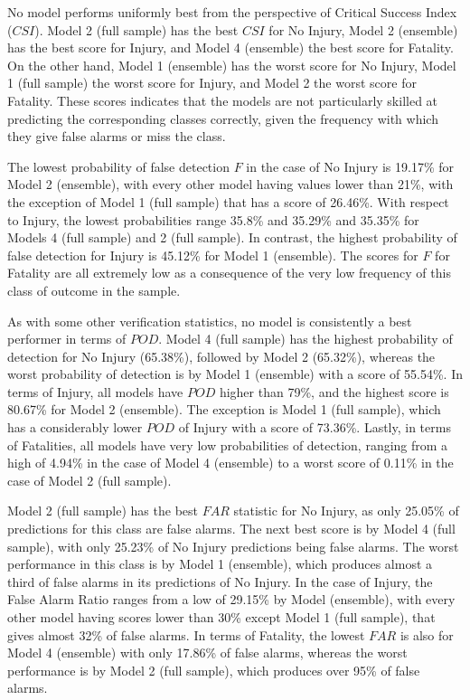 \documentclass[]{elsarticle} %
\begin{document}
No model performs uniformly best from the perspective of Critical
Success Index (\(CSI\)). Model 2 (full sample) has the best \(CSI\) for
No Injury, Model 2 (ensemble) has the best score for Injury, and Model 4
(ensemble) the best score for Fatality. On the other hand, Model 1
(ensemble) has the worst score for No Injury, Model 1 (full sample) the
worst score for Injury, and Model 2 the worst score for Fatality. These
scores indicates that the models are not particularly skilled at
predicting the corresponding classes correctly, given the frequency with
which they give false alarms or miss the class.

The lowest probability of false detection \(F\) in the case of No Injury
is 19.17\% for Model 2 (ensemble), with every other model having values
lower than 21\%, with the exception of Model 1 (full sample) that has a
score of 26.46\%. With respect to Injury, the lowest probabilities range
35.8\% and 35.29\% and 35.35\% for Models 4 (full sample) and 2 (full
sample). In contrast, the highest probability of false detection for
Injury is 45.12\% for Model 1 (ensemble). The scores for \(F\) for
Fatality are all extremely low as a consequence of the very low
frequency of this class of outcome in the sample.

As with some other verification statistics, no model is consistently a
best performer in terms of \(POD\). Model 4 (full sample) has the
highest probability of detection for No Injury (65.38\%), followed by
Model 2 (65.32\%), whereas the worst probability of detection is by
Model 1 (ensemble) with a score of 55.54\%. In terms of Injury, all
models have \(POD\) higher than 79\%, and the highest score is 80.67\%
for Model 2 (ensemble). The exception is Model 1 (full sample), which
has a considerably lower \(POD\) of Injury with a score of 73.36\%.
Lastly, in terms of Fatalities, all models have very low probabilities
of detection, ranging from a high of 4.94\% in the case of Model 4
(ensemble) to a worst score of 0.11\% in the case of Model 2 (full
sample).

Model 2 (full sample) has the best \(FAR\) statistic for No Injury, as
only 25.05\% of predictions for this class are false alarms. The next
best score is by Model 4 (full sample), with only 25.23\% of No Injury
predictions being false alarms. The worst performance in this class is
by Model 1 (ensemble), which produces almost a third of false alarms in
its predictions of No Injury. In the case of Injury, the False Alarm
Ratio ranges from a low of 29.15\% by Model (ensemble), with every other
model having scores lower than 30\% except Model 1 (full sample), that
gives almost 32\% of false alarms. In terms of Fatality, the lowest
\(FAR\) is also for Model 4 (ensemble) with only 17.86\% of false
alarms, whereas the worst performance is by Model 2 (full sample), which
produces over 95\% of false alarms.
\end{document}
